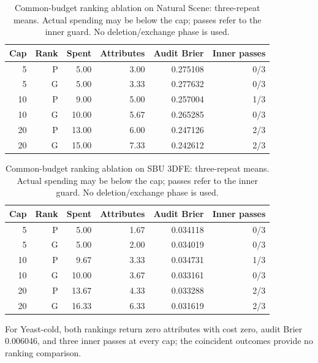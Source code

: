 \begin{table}[htbp]
\centering\small\renewcommand{\arraystretch}{1.35}\setlength{\tabcolsep}{7pt}
\caption{Common-budget ranking ablation on Natural Scene: three-repeat means. Actual spending may be below the cap; passes refer to the inner guard. No deletion/exchange phase is used.}
\label{tab:budget-natural}
\begin{tabular}{rrrrrr}\hline
Cap & Rank & Spent & Attributes & Audit Brier & Inner passes\\\hline
5 & P & 5.00 & 3.00 & 0.275108 & 0/3\\
5 & G & 5.00 & 3.33 & 0.277632 & 0/3\\
10 & P & 9.00 & 5.00 & 0.257004 & 1/3\\
10 & G & 10.00 & 5.67 & 0.265285 & 0/3\\
20 & P & 13.00 & 6.00 & 0.247126 & 2/3\\
20 & G & 15.00 & 7.33 & 0.242612 & 2/3\\
\hline\end{tabular}\end{table}

\begin{table}[htbp]
\centering\small\renewcommand{\arraystretch}{1.35}\setlength{\tabcolsep}{7pt}
\caption{Common-budget ranking ablation on SBU 3DFE: three-repeat means. Actual spending may be below the cap; passes refer to the inner guard. No deletion/exchange phase is used.}
\label{tab:budget-sbu}
\begin{tabular}{rrrrrr}\hline
Cap & Rank & Spent & Attributes & Audit Brier & Inner passes\\\hline
5 & P & 5.00 & 1.67 & 0.034118 & 0/3\\
5 & G & 5.00 & 2.00 & 0.034019 & 0/3\\
10 & P & 9.67 & 3.33 & 0.034731 & 1/3\\
10 & G & 10.00 & 3.67 & 0.033161 & 0/3\\
20 & P & 13.67 & 4.33 & 0.033288 & 2/3\\
20 & G & 16.33 & 6.33 & 0.031619 & 2/3\\
\hline\end{tabular}\end{table}
For Yeast-cold, both rankings return zero attributes with cost zero, audit Brier 0.006046, and three inner passes at every cap; the coincident outcomes provide no ranking comparison.
